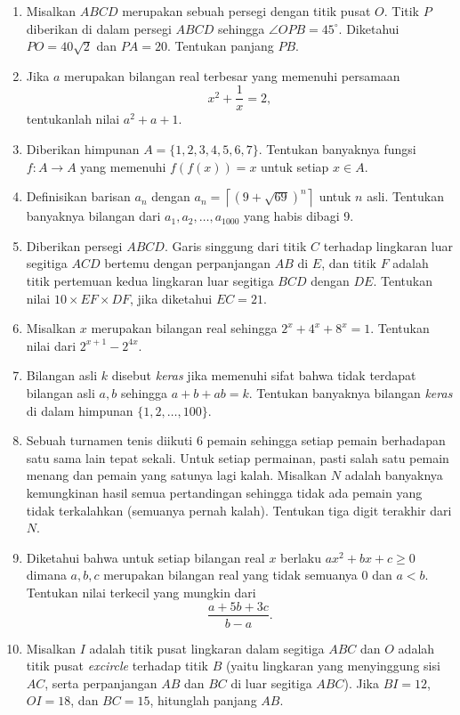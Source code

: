 \documentclass[12pt]{scrartcl}
\begin{document}
\begin{enumerate}
		\item Misalkan $ABCD$ merupakan sebuah persegi dengan titik pusat $O$. Titik $P$ diberikan di dalam persegi $ABCD$ sehingga $\angle OPB = 45^\circ$. Diketahui $PO=40\sqrt{2}$ dan $PA=20$. Tentukan panjang $PB$.
		
		\item Jika $a$ merupakan bilangan real terbesar yang memenuhi persamaan $$x^2+\frac{1}{x}=2,$$ tentukanlah nilai $a^2+a+1$.
		
		\item Diberikan himpunan $A = \{1,2,3,4,5,6,7\}$. Tentukan banyaknya fungsi $f:A \rightarrow A$ yang memenuhi $f(f(x))=x$ untuk setiap $x \in A$.
		
		\item Definisikan barisan $a_n$ dengan $a_n = \left \lceil (9+\sqrt{69})^n \right \rceil$ untuk $n$ asli. Tentukan banyaknya bilangan dari $a_1, a_2,\dots, a_{1000}$ yang habis dibagi 9.
		
		\item Diberikan persegi $ABCD$. Garis singgung dari titik $C$ terhadap lingkaran luar segitiga $ACD$ bertemu dengan perpanjangan $AB$ di $E$, dan titik $F$ adalah titik pertemuan kedua lingkaran luar segitiga $BCD$ dengan $DE$. Tentukan nilai $10 \times EF\times DF$, jika diketahui $EC=21$.
		
		\item Misalkan $x$ merupakan bilangan real sehingga $2^x+4^x+8^x=1$. Tentukan nilai dari $2^{x+1}-2^{4x}$.
		
		\item Bilangan asli $k$ disebut \textit{keras} jika memenuhi sifat bahwa tidak terdapat bilangan asli $a,b$ sehingga $a+b+ab=k$. Tentukan banyaknya bilangan \textit{keras} di dalam himpunan $\{1,2,\dots,100\}$.
		
		\item Sebuah turnamen tenis diikuti 6 pemain sehingga setiap pemain berhadapan satu sama lain tepat sekali. Untuk setiap permainan, pasti salah satu pemain menang dan pemain yang satunya lagi kalah. Misalkan $N$ adalah banyaknya kemungkinan hasil semua pertandingan sehingga tidak ada pemain yang tidak terkalahkan (semuanya pernah kalah). Tentukan tiga digit terakhir dari $N$.
		
		\item Diketahui bahwa untuk setiap bilangan real $x$ berlaku $ax^2+bx+c \ge 0$ dimana $a,b,c$ merupakan bilangan real yang tidak semuanya $0$ dan $a<b$. Tentukan nilai terkecil yang mungkin dari $$\frac{a+5b+3c}{b-a}.$$
		
		\item Misalkan $I$ adalah titik pusat lingkaran dalam segitiga $ABC$ dan $O$ adalah titik pusat \textit{excircle} terhadap titik $B$ (yaitu lingkaran yang menyinggung sisi $AC$, serta perpanjangan $AB$ dan $BC$ di luar segitiga $ABC$). Jika $BI=12$, $OI=18$, dan $BC=15$, hitunglah panjang $AB$.  
\end{enumerate}
\end{document}
